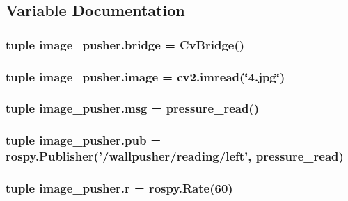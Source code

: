 \subsection{Variable Documentation}
\hypertarget{namespaceimage__pusher_ad4ee010cfc610094085b814056c62857}{
\subsubsection[{bridge}]{\setlength{\rightskip}{0pt plus 5cm}tuple image\-\_\-pusher.\-bridge = Cv\-Bridge()}}\label{namespaceimage__pusher_ad4ee010cfc610094085b814056c62857}
\hypertarget{namespaceimage__pusher_ad375c9c3ddd05d32812d3253b62e917e}{
\subsubsection[{image}]{\setlength{\rightskip}{0pt plus 5cm}tuple image\-\_\-pusher.\-image = cv2.\-imread(\char`\"{}4.jpg\char`\"{})}}\label{namespaceimage__pusher_ad375c9c3ddd05d32812d3253b62e917e}
\hypertarget{namespaceimage__pusher_a7cfbf1860db6dc5c963a9f40e6d9e1ab}{
\subsubsection[{msg}]{\setlength{\rightskip}{0pt plus 5cm}tuple image\-\_\-pusher.\-msg = pressure\-\_\-read()}}\label{namespaceimage__pusher_a7cfbf1860db6dc5c963a9f40e6d9e1ab}
\hypertarget{namespaceimage__pusher_a1e85e2d0766ab8425d767cecd38521b5}{
\subsubsection[{pub}]{\setlength{\rightskip}{0pt plus 5cm}tuple image\-\_\-pusher.\-pub = rospy.\-Publisher('/wallpusher/reading/left', pressure\-\_\-read)}}\label{namespaceimage__pusher_a1e85e2d0766ab8425d767cecd38521b5}
\hypertarget{namespaceimage__pusher_a3310000918e26e069c4618cfdf9f0b6c}{
\subsubsection[{r}]{\setlength{\rightskip}{0pt plus 5cm}tuple image\-\_\-pusher.\-r = rospy.\-Rate(60)}}\label{namespaceimage__pusher_a3310000918e26e069c4618cfdf9f0b6c}
